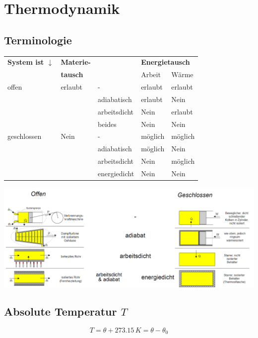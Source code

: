 \section{Thermodynamik}

\subsection{Terminologie}

\begin{center}
    \begin{tabular}{l||l|lll}
        \textbf{System ist $\downarrow$} & \textbf{Materie-} & & \multicolumn{2}{l}{\textbf{Energietausch}}  \\
			& \textbf{tausch} &	& Arbeit & Wärme \\ \hline
		offen & erlaubt & - & erlaubt  & erlaubt \\
		      &         & adiabatisch  & erlaubt & Nein\\
			  &         & arbeitsdicht & Nein    & erlaubt\\
			  &         & beides       & Nein    & Nein\\ \hline
		geschlossen & Nein & - & möglich  & möglich \\
		      &         & adiabatisch  & möglich & Nein\\
			  &         & arbeitsdicht & Nein    & möglich\\
			  &         & energiedicht & Nein    & Nein\\
	\end{tabular}
\end{center}

\includegraphics[width=\linewidth]{Bilder/thermodynamisches_system.png}

\subsection{Absolute Temperatur $T$}
$$ \boxed{ T = \theta + 273.15 \, K = \theta - \theta_0 }$$

